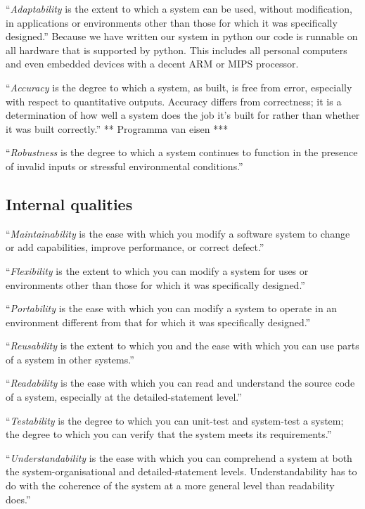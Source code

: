 \documentclass[a4paper, openany, oneside]{memoir}
\begin{document}
``\textit{Adaptability} is the extent to which a system can be used, without modification, in applications or environments other than those for which it was specifically designed.'' Because we have written our system in python our code is runnable on all hardware that is supported by python. This includes all personal computers and even embedded devices with a decent ARM or MIPS processor.

``\textit{Accuracy} is the degree to which a system, as built, is free from error, especially with respect to quantitative outputs. Accuracy differs from correctness; it is a determination of how well a system does the job it's built for rather than whether it was built correctly.'' ** Programma van eisen ***

``\textit{Robustness} is the degree to which a system continues to function in the presence of invalid inputs or stressful environmental conditions.''

\subsection{Internal qualities}
``\textit{Maintainability} is the ease with which you modify a software system to change or add capabilities, improve performance, or correct defect.''

``\textit{Flexibility} is the extent to which you can modify a system for uses or environments other than those for which it was specifically designed.''

``\textit{Portability} is the ease with which you can modify a system to operate in an environment different from that for which it was specifically designed.''

``\textit{Reusability} is the extent to which you and the ease with which you can use parts of a system in other systems.''

``\textit{Readability} is the ease with which you can read and understand the source code of a system, especially at the detailed-statement level.''

``\textit{Testability} is the degree to which you can unit-test and system-test a system; the degree to which you can verify that the system meets its requirements.''

``\textit{Understandability} is the ease with which you can comprehend a system at both the system-organisational and detailed-statement levels. Understandability has to do with the coherence of the system at a more general level than readability does.''
\end{document}
